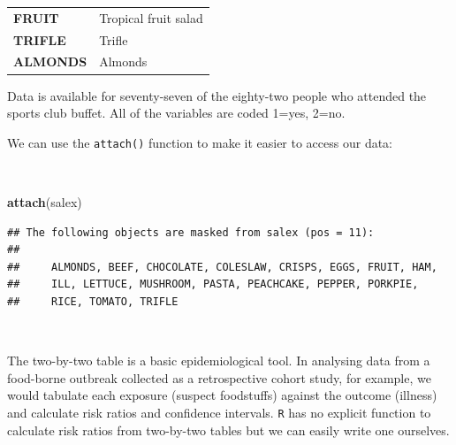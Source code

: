 \documentclass[12pt,a4paper]{book}
\newenvironment{Shaded}{\begin{snugshade}}{\end{snugshade}}
\newcommand{\KeywordTok}[1]{\textcolor[rgb]{0.13,0.29,0.53}{\textbf{#1}}}
\newcommand{\NormalTok}[1]{#1}
\theoremstyle{definition}
\theoremstyle{definition}
\theoremstyle{definition}
\theoremstyle{remark}
\begin{document}
\begin{longtable}[]{@{}ll@{}}
\begin{minipage}[t]{0.21\columnwidth}\raggedright
\textbf{FRUIT}\strut
\end{minipage} & \begin{minipage}[t]{0.30\columnwidth}\raggedright
Tropical fruit salad\strut
\end{minipage}\tabularnewline
\begin{minipage}[t]{0.21\columnwidth}\raggedright
\textbf{TRIFLE}\strut
\end{minipage} & \begin{minipage}[t]{0.30\columnwidth}\raggedright
Trifle\strut
\end{minipage}\tabularnewline
\begin{minipage}[t]{0.21\columnwidth}\raggedright
\textbf{ALMONDS}\strut
\end{minipage} & \begin{minipage}[t]{0.30\columnwidth}\raggedright
Almonds\strut
\end{minipage}\tabularnewline
\bottomrule
\end{longtable}

Data is available for seventy-seven of the eighty-two people who
attended the sports club buffet. All of the variables are coded 1=yes,
2=no.

\newpage

We can use the \texttt{attach()} function to make it easier to access
our data:

~

\begin{Shaded}
\begin{Highlighting}[]
\KeywordTok{attach}\NormalTok{(salex)}
\end{Highlighting}
\end{Shaded}

\begin{verbatim}
## The following objects are masked from salex (pos = 11):
## 
##     ALMONDS, BEEF, CHOCOLATE, COLESLAW, CRISPS, EGGS, FRUIT, HAM,
##     ILL, LETTUCE, MUSHROOM, PASTA, PEACHCAKE, PEPPER, PORKPIE,
##     RICE, TOMATO, TRIFLE
\end{verbatim}

~

The two-by-two table is a basic epidemiological tool. In analysing data
from a food-borne outbreak collected as a retrospective cohort study,
for example, we would tabulate each exposure (suspect foodstuffs)
against the outcome (illness) and calculate risk ratios and confidence
intervals. \texttt{R} has no explicit function to calculate risk ratios
from two-by-two tables but we can easily write one ourselves.
\end{document}
